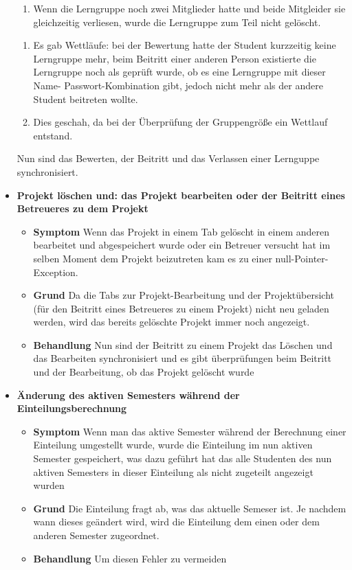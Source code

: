 \documentclass[parskip=full]{scrartcl}
\newcommand{\fehler}[4]{\textbf{#1}
 							\begin{itemize}
 							  \item \textbf{Symptom}  #2
 							  \item \textbf{Grund} #3
 							  \item \textbf{Behandlung} #4
 							\end{itemize}}
\newcommand{\code}[1]{{\ttfamily #1}}
\begin{document}
\begin{itemize}
{\begin{enumerate}
    Lerngruppe verlies und sie somit gelöscht wurde und  im selben Moment 
    Bewertungen für sie abzugeben wurden oder ein anderer Student versuchte ihr
    beizutreten kam es teilweise zu \code{null}-Pointer-Exceptions.
    \item Wenn die
    Lerngruppe noch zwei Mitglieder hatte und beide Mitgleider sie gleichzeitig
    verliesen, wurde die Lerngruppe zum Teil nicht gelöscht.
    \end{enumerate}  }
    {\begin{enumerate}
      \item Es gab Wettläufe: bei der Bewertung hatte der Student kurzzeitig
      keine Lerngruppe mehr, beim Beitritt einer anderen Person existierte die
      Lerngruppe noch als geprüft wurde, ob es eine Lerngruppe mit dieser Name-
      Passwort-Kombination gibt, jedoch nicht mehr als der andere Student
      beitreten wollte.
      \item Dies geschah, da bei der Überprüfung der Gruppengröße ein
      Wettlauf entstand.
    \end{enumerate} }{Nun sind das Bewerten, der Beitritt und das Verlassen einer Lernguppe synchronisiert.}
    \item \fehler{Projekt löschen und: das Projekt bearbeiten oder der Beitritt
    eines Betreueres zu dem Projekt }{Wenn das Projekt in einem Tab
    gelöscht in einem anderen bearbeitet und abgespeichert wurde oder ein
    Betreuer versucht hat im selben Moment dem Projekt beizutreten kam es zu
    einer \code{null}-Pointer-Exception.
    }{Da die Tabs zur Projekt-Bearbeitung und der Projektübersicht (für den
    Beitritt eines Betreueres zu einem Projekt) nicht neu geladen werden, wird
    das bereits gelöschte Projekt immer noch angezeigt.}{Nun sind der Beitritt
    zu einem Projekt das Löschen und das Bearbeiten synchronisiert und es gibt
    überprüfungen beim Beitritt und der Bearbeitung, ob das Projekt gelöscht
    wurde}
    \item \fehler{Änderung des aktiven Semesters während der
    Einteilungsberechnung }{Wenn man das aktive Semester während der
    Berechnung einer Einteilung umgestellt wurde, wurde die Einteilung im
    nun aktiven Semester gespeichert, was dazu geführt hat das alle
    Studenten des nun aktiven Semesters in dieser Einteilung als nicht
    zugeteilt angezeigt wurden}{Die Einteilung fragt ab, was das aktuelle
    Semeser ist. Je nachdem wann dieses geändert wird, wird die Einteilung dem
    einen oder dem anderen Semester zugeordnet.}{Um diesen Fehler zu vermeiden
}
\end{itemize}
\end{document}
